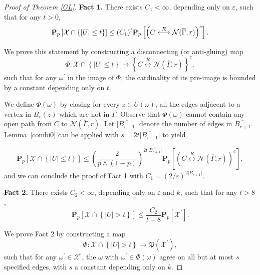 \documentclass[12pt, twoside,a4paper,reqno]{amsart}
\theoremstyle{plain}
\theoremstyle{remark}
\theoremstyle{definition}
\newcommand{\eps}{\varepsilon}
\newcommand{\lr}[1][]{\overset{\:#1\:}\longleftrightarrow}
\newcommand{\ol}{\overline}
\renewcommand{\bar}{\overline}
\begin{document}
\begin{proof} [Proof of Theorem \ref{GL}]
\textbf{Fact 1.} There exists $C_{1}<\infty $, depending only on $\eps$, such
that for any $t >0$,
\begin{equation*}
\mathbf{P}_{p}\left[ \mathcal{X}\cap \left\{ \left\vert U\right\vert
\leq t\right\} \right] \leq (C_{1})^{\/t}\mathbf{P}_{p}\left[ \left(C\lr[R] \mathcal{N}(\bar \Gamma, r)\right) ^{c}\right] .
\end{equation*}

We prove this statement by constructing a disconnecting (or anti-gluing) map
\begin{equation*}
\Phi :\mathcal{X}\cap \left\{ \left\vert U\right\vert \leq t\right\} \rightarrow
\left\{C\lr[R] \mathcal{N}(\bar \Gamma, r)\right\} ^{c},
\end{equation*}%
such that for any $\omega ^{\prime }$ in the image of $\Phi $, the
cardinality of its pre-image is bounded by a constant depending only on $t$.

We define $\Phi(\omega) $ by closing for every $z\in U( \omega)$, all the edges
adjacent to a vertex in $\overline{B_{r}(z)}$ which are not in $\Gamma$. Observe
that $\Phi(\omega)$ cannot contain any open path from $C$ to $\mathcal{N}(\bar
\Gamma, r)$. Let $\vert \ol{B_{r+1}}\vert $ denote the number of edges in
$\ol{B_{r+1}}$. Lemma~\ref{combi0} can be applied with $s= 2 t \vert
\ol{B_{r+1}} \vert $ to yield

\begin{equation*}
\mathbf{P}_{p}\left[ \mathcal{X}\cap \left\{ \left\vert U\right\vert
\leq t\right\} \right] \leq \left( \frac{2}{p\wedge \left( 1-p\right) }\right)
^{2t\vert\ol{ B_{r+1}}\vert }\mathbf{P}_{p}\left[ \left( C\lr[R] \mathcal{N}(\bar \Gamma, r)\right) ^{c}\right] ,
\end{equation*}%
and we can conclude the proof of Fact 1 with $C_{1}=(2/\eps)^{2\vert \ol{B_{r+1}} \vert}$.

\textbf{Fact 2.} There exists $C_{2}<\infty $, depending only on $\eps$ and $k$, such that for any $t>8$,
\begin{equation*}
\mathbf{P}_{p}\left[ \mathcal{X}\cap \left\{ \left\vert U\right\vert
>t\right\} \right] \leq \frac{C_{2}}{t-8}\mathbf{P}_{p}\left[ \mathcal{X}%
^{\prime }\right].
\end{equation*}


We prove Fact 2 by constructing a map
\begin{equation*}
\Phi :\mathcal{X}\cap \left\{ \left\vert U\right\vert >t\right\} \rightarrow
\mathfrak{P}(\mathcal{X}^{\prime }),
\end{equation*}%
such that for any $\omega ^{\prime } \in \mathcal{X}^{\prime }$, the $\omega$ with
$\omega ^{\prime } \in \Phi (\omega)$ agree on all but at most $s$ specified edges, with $s$
a constant depending only on $k$.


\end{proof}
\end{document}
